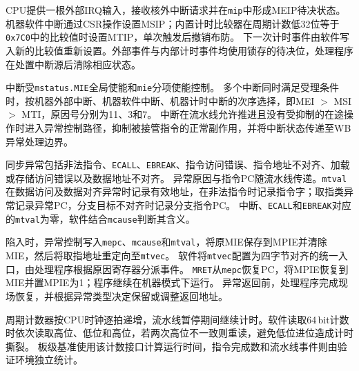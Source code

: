 CPU提供一根外部IRQ输入，接收核外中断请求并在\texttt{mip}中形成MEIP待决状态。
机器软件中断通过CSR操作设置MSIP；内置计时比较器在周期计数低32位等于\texttt{0x7C0}中的比较值时设置MTIP，单次触发后撤销布防。
下一次计时事件由软件写入新的比较值重新设置。外部事件与内部计时事件均使用锁存的待决位，处理程序在处置中断源后清除相应状态。

中断受\texttt{mstatus.MIE}全局使能和\texttt{mie}分项使能控制。
多个中断同时满足受理条件时，按机器外部中断、机器软件中断、机器计时中断的次序选择，即MEI $>$ MSI $>$ MTI，原因号分别为11、3和7。
中断在流水线允许推进且没有受抑制的在途操作时进入异常控制路径，抑制被接管指令的正常副作用，并将中断状态传递至WB异常处理边界。

同步异常包括非法指令、\texttt{ECALL}、\texttt{EBREAK}、指令访问错误、指令地址不对齐、加载或存储访问错误以及数据地址不对齐。
异常原因与指令PC随流水线传递。\texttt{mtval}在数据访问及数据对齐异常时记录有效地址，在非法指令时记录指令字；取指类异常记录异常PC，分支目标不对齐时记录分支指令PC。
中断、\texttt{ECALL}和\texttt{EBREAK}对应的\texttt{mtval}为零，软件结合\texttt{mcause}判断其含义。

陷入时，异常控制写入\texttt{mepc}、\texttt{mcause}和\texttt{mtval}，将原MIE保存到MPIE并清除MIE，然后将取指地址重定向至\texttt{mtvec}。
软件将\texttt{mtvec}配置为四字节对齐的统一入口，由处理程序根据原因寄存器分派事件。
\texttt{MRET}从\texttt{mepc}恢复PC，将MPIE恢复到MIE并置MPIE为1；程序继续在机器模式下运行。
异常返回前，处理程序完成现场恢复，并根据异常类型决定保留或调整返回地址。

周期计数器按CPU时钟逐拍递增，流水线暂停期间继续计时。软件读取64\,bit计数时依次读取高位、低位和高位，若两次高位不一致则重读，避免低位进位造成计时撕裂。
板级基准使用该计数接口计算运行时间，指令完成数和流水线事件则由验证环境独立统计。

